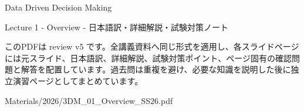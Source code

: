 \documentclass[a4paper,landscape,9pt]{article}
\begin{document}
\begin{titlepage}
\centering
\vspace*{2cm}
{\Huge Data Driven Decision Making\par}
\vspace{0.5cm}
{\Large Lecture 1 - Overview - 日本語訳・詳細解説・試験対策ノート\par}
\vspace{1cm}
\begin{minipage}{0.82\textwidth}
このPDFは review v5 です。全講義資料へ同じ形式を適用し、各スライドページには元スライド、日本語訳、詳細解説、試験対策ポイント、ページ固有の確認問題と解答を配置しています。過去問は重複を避け、必要な知識を説明した後に独立演習ページとしてまとめています。
\end{minipage}
\vfill
{\large Materials/2026/3DM\_01\_Overview\_SS26.pdf}
\end{titlepage}
\tableofcontents
\clearpage

\end{document}
